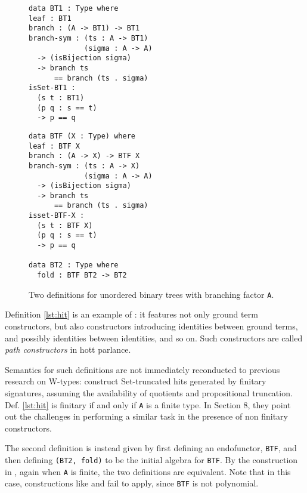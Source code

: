 \documentclass[a4paper]{article}
\begin{document}
\bgroup
\renewcommand{\lstlistingname}{Definition}
\begin{figure}
	\caption{Two definitions for unordered binary trees with branching factor \texttt{A}.}
	\label{fig:trdefs}
	\centering
	\begin{minipage}{.45\textwidth}
		\begin{lstlisting}[caption={\gls{hit} based},label={lst:hit}]
data BT1 : Type where
leaf : BT1
branch : (A -> BT1) -> BT1
branch-sym : (ts : A -> BT1)
             (sigma : A -> A)
  -> (isBijection sigma)
  -> branch ts 
      == branch (ts . sigma)
isSet-BT1 :
  (s t : BT1)
  (p q : s == t)
  -> p == q
\end{lstlisting}
	\end{minipage}
	\qquad
	\begin{minipage}{.45\textwidth}
		\begin{lstlisting}[caption={Initial algebra based},label={lst:fix}]
data BTF (X : Type) where
leaf : BTF X
branch : (A -> X) -> BTF X
branch-sym : (ts : A -> X)
             (sigma : A -> A)
  -> (isBijection sigma)
  -> branch ts 
      == branch (ts . sigma)
isset-BTF-X :
  (s t : BTF X)
  (p q : s == t)
  -> p == q

data BT2 : Type where
  fold : BTF BT2 -> BT2
\end{lstlisting}
	\end{minipage}
\end{figure}
\egroup

Definition \ref{lst:hit} is an example of : it features not only ground term constructors, but also constructors introducing identities between ground terms, and possibly identities between identities, and so on. Such constructors are called \textit{path constructors} in \gls{hott} parlance.

Semantics for such definitions are not immediately reconducted to previous research on W-types: \textcite{Weide2019} construct Set-truncated \glspl{hit} generated by finitary signatures, assuming the availability of quotients and propositional truncation. Def. \ref{lst:hit} is finitary if and only if \texttt{A} is a finite type. In Section 8, they point out the challenges in performing a similar task in the presence of non finitary constructors.

The second definition is instead given by first defining an endofunctor, \texttt{BTF}, and then defining \texttt{(BT2, fold)} to be the initial algebra for \texttt{BTF}. By the construction in \cite{Weide2019}, again when \texttt{A} is finite, the two definitions are equivalent. Note that in this case, constructions like \cite{Moerdijk2000} and \cite{Pitts2021} fail to apply, since \texttt{BTF} is not polynomial.
\end{document}
